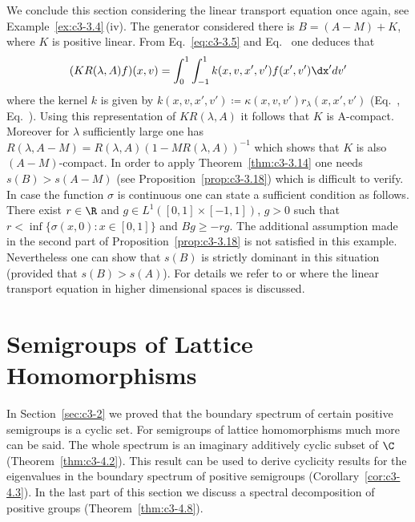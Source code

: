 We conclude this section considering the linear transport equation%
once again, see Example~\ref{ex:c3-3.4}\,(iv).
The generator considered there is $B = (A - M) + K$, where $K$ is positive linear. 
From Eq.~\eqref{eq:c3-3.5} and Eq.~ one deduces that 
\[
(KR(\lambda,A)f)(x,v) = \int_{0}^{1}\int_{-1}^{1} k(x,v,x',v')f(x',v')\dx'dv'
\]
where the kernel $k$ is given by $k(x,v,x',v') \coloneqq  \kappa(x,v,v')r_{\lambda}(x,x',v')$ (\cf Eq.~, Eq.~). 
Using this representation of\/ $KR(\lambda,A)$ it follows that $K$ is A-compact. 
Moreover for $\lambda$ sufficiently large one has $R(\lambda,A-M) = R(\lambda,A)(1 - MR(\lambda,A))^{-1}$ which shows that $K$ is also $(A-M)$-compact. 
In order to apply Theorem~\ref{thm:c3-3.14} one needs $s(B) > s(A-M)$ (see Proposition~\ref{prop:c3-3.18}) which is difficult to verify. 
In case the function $\sigma$ is continuous one can state a sufficient condition as follows.
There exist $r \in \R $ and $g \in L^{1}([0,1]\times[-1,1])$, $g > 0$ such that $r < \inf\{\sigma(x,0) \colon x \in [0,1]\}$ and $Bg \geq -rg$.
The additional assumption made in the second part of Proposition~\ref{prop:c3-3.18} is not satisfied in this example. 
Nevertheless one can show that $s(B)$ is strictly dominant in this situation (provided that $s(B) > s(A)$). 
For details we refer to \textcite{greiner:1984d}  or \textcite{voigt:1985} where the linear transport equation in higher dimensional spaces is discussed.
\section{Semigroups of Lattice Homomorphisms}\label{sec:c3-4}
In Section~\ref{sec:c3-2} we proved that the boundary spectrum of certain positive semigroups is a cyclic set. 
For semigroups of lattice homomorphisms much more can be said. 
The whole spectrum is an imaginary additively cyclic subset of\/ $\C $ (\cf Theorem~\ref{thm:c3-4.2}). 
This result can be used to derive cyclicity results for the eigenvalues in the boundary spectrum of positive semigroups (\cf Corollary~\ref{cor:c3-4.3}). 
In the last part of this section we discuss a spectral decomposition of positive groups (\cf Theorem~\ref{thm:c3-4.8}).

